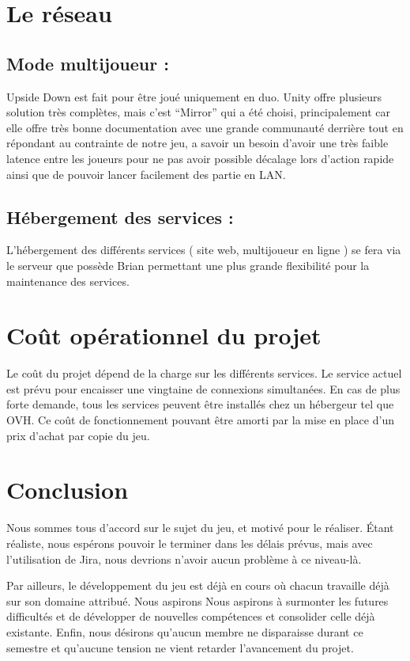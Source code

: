 \documentclass[a4paper,11pt]{article}
\begin{document}
\section{Le réseau}

\subsection{Mode multijoueur :} 
	
Upside Down est fait pour être joué uniquement en duo. Unity offre plusieurs solution très complètes, 
mais c’est “Mirror” qui a été choisi, principalement car elle offre très bonne documentation avec une 
grande communauté derrière tout en répondant au contrainte de notre jeu, a savoir un besoin d’avoir une 
très faible latence entre les joueurs pour ne pas avoir possible décalage lors d’action rapide ainsi 
que de pouvoir lancer facilement des partie en LAN.


\subsection{Hébergement des services :}
	
L'hébergement des différents services ( site web, multijoueur en ligne ) se fera via le serveur 
que possède Brian permettant une plus grande flexibilité pour la maintenance des services.



\section{Coût opérationnel du projet}

Le coût du projet dépend de la charge sur les différents services.
Le service actuel est prévu pour encaisser une vingtaine de connexions simultanées.
En cas de plus forte demande, tous les services peuvent être installés chez un hébergeur tel que OVH. 
Ce coût de fonctionnement pouvant être amorti par la mise en place d’un prix d’achat par copie du jeu.


\section{Conclusion}

Nous sommes tous d'accord sur le sujet du jeu, et motivé pour le réaliser. Étant réaliste, nous espérons pouvoir le terminer
dans les délais prévus, mais avec l'utilisation de Jira, nous devrions n'avoir aucun problème à ce niveau-là.

Par ailleurs, le développement du jeu est déjà en cours où chacun travaille déjà sur son domaine attribué. Nous aspirons
Nous aspirons à surmonter les futures difficultés et de développer de nouvelles compétences et consolider celle déjà existante.
Enfin, nous désirons qu'aucun membre ne disparaisse durant ce semestre et qu'aucune tension ne vient retarder l'avancement du projet.
\end{document}
